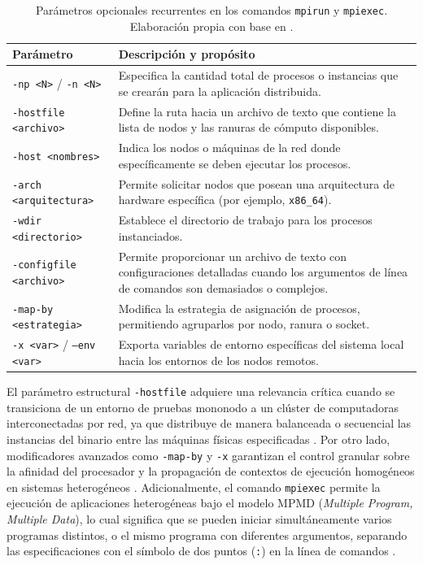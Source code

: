 \begin{table}[h]
\centering
\caption{Parámetros opcionales recurrentes en los comandos \texttt{mpirun} y \texttt{mpiexec}. Elaboración propia con base en \cite{mpi_forum_2025, open_mpi_2026, pacheco_2011}.}
\label{tab:parametros_mpirun}
\begin{tabular}{|l|p{10cm}|}
\hline
\textbf{Parámetro} & \textbf{Descripción y propósito} \\ \hline
\texttt{-np <N>} / \texttt{-n <N>} & Especifica la cantidad total de procesos o instancias que se crearán para la aplicación distribuida. \\ \hline
\texttt{-hostfile <archivo>} & Define la ruta hacia un archivo de texto que contiene la lista de nodos y las ranuras de cómputo disponibles. \\ \hline
\texttt{-host <nombres>} & Indica los nodos o máquinas de la red donde específicamente se deben ejecutar los procesos. \\ \hline
\texttt{-arch <arquitectura>} & Permite solicitar nodos que posean una arquitectura de hardware específica (por ejemplo, \texttt{x86\_64}). \\ \hline
\texttt{-wdir <directorio>} & Establece el directorio de trabajo para los procesos instanciados. \\ \hline
\texttt{-configfile <archivo>} & Permite proporcionar un archivo de texto con configuraciones detalladas cuando los argumentos de línea de comandos son demasiados o complejos. \\ \hline
\texttt{-map-by <estrategia>} & Modifica la estrategia de asignación de procesos, permitiendo agruparlos por nodo, ranura o socket. \\ \hline
\texttt{-x <var>} / \texttt{--env <var>} & Exporta variables de entorno específicas del sistema local hacia los entornos de los nodos remotos. \\ \hline
\end{tabular}
\end{table}

El parámetro estructural \texttt{-hostfile} adquiere una relevancia crítica cuando se transiciona de un entorno de pruebas mononodo a un clúster de computadoras interconectadas por red, ya que distribuye de manera balanceada o secuencial las instancias del binario entre las máquinas físicas especificadas \cite{grama_intro_parallel_2003}. Por otro lado, modificadores avanzados como \texttt{-map-by} y \texttt{-x} garantizan el control granular sobre la afinidad del procesador y la propagación de contextos de ejecución homogéneos en sistemas heterogéneos \cite{open_mpi_2026}. Adicionalmente, el comando \texttt{mpiexec} permite la ejecución de aplicaciones heterogéneas bajo el modelo MPMD (\textit{Multiple Program, Multiple Data}), lo cual significa que se pueden iniciar simultáneamente varios programas distintos, o el mismo programa con diferentes argumentos, separando las especificaciones con el símbolo de dos puntos (\texttt{:}) en la línea de comandos \cite{mpi_forum_2025}.

